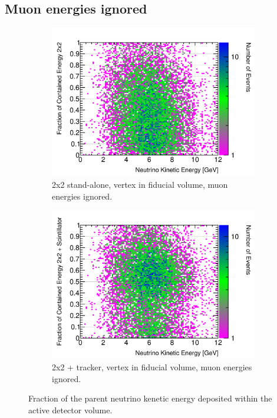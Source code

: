 \documentclass[10pt,a4paper,openany]{article}
\begin{document}
\clearpage
\subsection{Muon energies ignored}
\begin{figure}[!htb]
	\centering
	\begin{subfigure}[b]{0.49\textwidth}
		\centering
		\includegraphics[width=1.0\textwidth]{E_contained_frac_2x2_fiducial_gap_no_muon.png}
		\caption{2x2 stand-alone, vertex in fiducial volume, muon energies ignored.}
		\label{}
	\end{subfigure}	
	\hfill
	\begin{subfigure}[b]{0.49\textwidth}
		\centering
		\includegraphics[width=1.0\textwidth]{E_contained_frac_2x2_Scintillator_fiducial_gap_no_muon.png}
		\caption{2x2 + tracker, vertex in fiducial volume, muon energies ignored.}
		\label{}
	\end{subfigure}
  \caption{Fraction of the parent neutrino kenetic energy deposited within the active detector volume.}
\end{figure}
\end{document}
